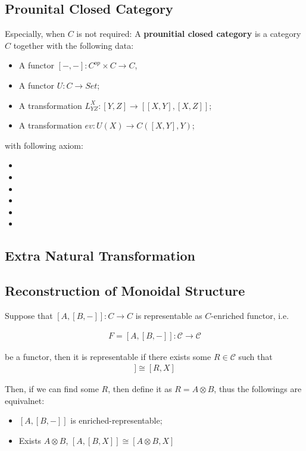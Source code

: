 \documentclass[Total.tex]{subfiles}
\begin{document}
			\subsection{Prounital Closed Category}
				\begin{Def}
					Especially, when $C$ is not required: A \textbf{prounitial closed category} is a category $C$ together with the following data:
					\begin{itemize}
						\item A functor $[-,-]:C^{op}\times C\rightarrow C$, 
						\item A functor $U:C\rightarrow Set$;
						\item A transformation $L_{YZ}^X:[Y,Z]\rightarrow [[X,Y],[X,Z]]$;
						\item A transformation $ev:U(X)\rightarrow C([X,Y],Y)$;
					\end{itemize}
					
					with following axiom:
					\begin{itemize}
						\item 
						\item 
						\item 
						\item 
						\item 
						\item 
					\end{itemize}
				\end{Def}
			\subsection{Extra Natural Transformation}
			\subsection{Reconstruction of Monoidal Structure}
			
				Suppose that $[A,[B,-]]:C\rightarrow C$ is representable as $C$-enriched functor, i.e.
				
				\begin{gather*}
					F=[A,[B,-]]:\mathcal{C}\rightarrow \mathcal{C}
				\end{gather*}
				
				be a functor, then it is representable if there exists some $R\in \mathcal{C}$ such that
				\begin{gather*}
					[A,[B,X]]\cong [R,X]
				\end{gather*}
				
				Then, if we can find some $R$, then define it as $R=A\otimes B$, thus the followings are equivalnet:
				\begin{itemize}
					\item $[A,[B,-]]$ is enriched-representable;
					\item Exists $A\otimes B$, $[A,[B,X]]\cong [A\otimes B,X]$
				\end{itemize}
\end{document}
